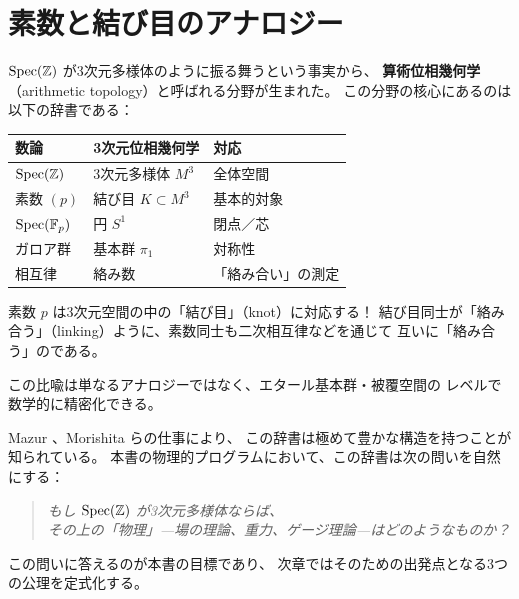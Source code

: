 \section{素数と結び目のアナロジー}
\label{sec:primes-knots}

\begin{hsbox}
$\operatorname{Spec}(\mathbb{Z})$ が3次元多様体のように振る舞うという事実から、
\textbf{算術位相幾何学}（arithmetic topology）と呼ばれる分野が生まれた。
この分野の核心にあるのは以下の辞書である：

\begin{center}
\begin{tabular}{lll}
\toprule
\textbf{数論} & \textbf{3次元位相幾何学} & \textbf{対応} \\
\midrule
$\operatorname{Spec}(\mathbb{Z})$ & 3次元多様体 $M^3$ & 全体空間 \\
素数 $(p)$ & 結び目 $K \subset M^3$ & 基本的対象 \\
$\operatorname{Spec}(\mathbb{F}_p)$ & 円 $S^1$ & 閉点／芯 \\
ガロア群 & 基本群 $\pi_1$ & 対称性 \\
相互律 & 絡み数 & 「絡み合い」の測定 \\
\bottomrule
\end{tabular}
\end{center}

素数 $p$ は3次元空間の中の「結び目」（knot）に対応する！
結び目同士が「絡み合う」（linking）ように、素数同士も二次相互律などを通じて
互いに「絡み合う」のである。

この比喩は単なるアナロジーではなく、エタール基本群・被覆空間の
レベルで数学的に精密化できる。
\end{hsbox}

Mazur \cite{Mazur1964}、Morishita \cite{Morishita2012} らの仕事により、
この辞書は極めて豊かな構造を持つことが知られている。
本書の物理的プログラムにおいて、この辞書は次の問いを自然にする：

\begin{quote}
\emph{もし $\operatorname{Spec}(\mathbb{Z})$ が3次元多様体ならば、\\
その上の「物理」---場の理論、重力、ゲージ理論---はどのようなものか？}
\end{quote}

この問いに答えるのが本書の目標であり、
次章ではそのための出発点となる3つの公理を定式化する。

\bigskip

